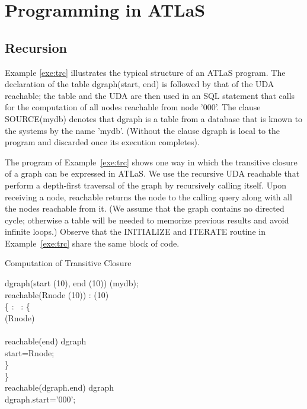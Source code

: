 \chapter{Programming in ATLaS}
\section{Recursion}
Example \ref{exe:trc} illustrates the typical structure of an ATLaS
program. The declaration of the table {\bw dgraph(start, end)} is followed
by that of the UDA {{\bw reachable}}; the table and the UDA are then used
in an SQL statement that calls for the computation of all nodes reachable from
node {\bw '000'}. The clause {\cw SOURCE({\bw mydb})} denotes that
{\bw dgraph} is a table from a database that is known to
the systems by the name {\bw 'mydb'}. (Without the {} clause
{\bw dgraph} is local to the program and discarded once its execution
 completes).

The program of Example~\ref{exe:trc}
shows one way in which the transitive closure
of  a graph can be expressed in
ATLaS. We use the recursive UDA {{\bw reachable}}
that perform a depth-first traversal of the graph
by recursively calling itself.  Upon receiving a node,
{{\bw reachable}} returns the node
to the calling query along with all the nodes reachable from it.
(We assume that the graph contains no directed cycle;
otherwise a table will be needed to memorize
previous results and avoid
infinite loops.)
Observe that the {\cw INITIALIZE} and {\cw ITERATE} routine in
Example~\ref{exe:trc} share the same block of code.


\begin{example}{Computation of Transitive Closure\label{exe:trc} \pinv}

\begin{codedisplay}
\>\> dgraph(start (10), end (10))   (mydb); \\[0.2CM]

\>\> reachable(Rnode (10)) : (10) \\
\>\>\{\> : \ : \{ \\
\>\>\>\>     (Rnode) \\
\>\>\>\>   \\
\>\>\>\>\>  reachable(end)  dgraph\\
\>\>\>\>\>   start=Rnode;  \\
\>\>\>\}\\
\>\>\}\\
\>\> reachable(dgraph.end)  dgraph \\
\>\> dgraph.start='000';
\end{codedisplay}

\end{example}


